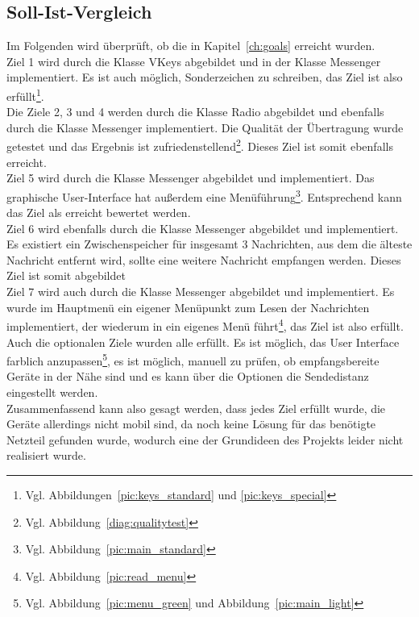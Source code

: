 \documentclass[a4paper, 11pt]{scrartcl}
\begin{document}
\subsection{Soll-Ist-Vergleich}
Im Folgenden wird überprüft, ob die in Kapitel~\ref{ch:goals} erreicht wurden.
\\
Ziel 1 wird durch die Klasse \glqq VKeys\grqq{} abgebildet und in der Klasse \grqq Messenger\glqq{} implementiert. 
Es ist auch möglich, Sonderzeichen zu schreiben, das Ziel ist also erfüllt\footnote{Vgl. Abbildungen~\ref{pic:keys_standard} und \ref{pic:keys_special}}.
\\
Die Ziele 2, 3 und 4 werden durch die Klasse \glqq Radio\grqq{} abgebildet und ebenfalls durch die Klasse \glqq Messenger\grqq{} implementiert. Die Qualität der Übertragung
wurde getestet und das Ergebnis ist zufriedenstellend\footnote{Vgl. Abbildung~\ref{diag:qualitytest}}. Dieses Ziel ist somit ebenfalls erreicht.
\\
Ziel 5 wird durch die Klasse \glqq Messenger\grqq{} abgebildet und implementiert. Das graphische User-Interface hat außerdem eine 
Menüführung\footnote{Vgl. Abbildung~\ref{pic:main_standard}}. Entsprechend kann das Ziel als erreicht bewertet werden.
\\
Ziel 6 wird ebenfalls durch die Klasse \glqq Messenger\grqq{} abgebildet und implementiert. Es existiert ein Zwischenspeicher für insgesamt 3 Nachrichten, aus dem
die älteste Nachricht entfernt wird, sollte eine weitere Nachricht empfangen werden. Dieses Ziel ist somit abgebildet
\\
Ziel 7 wird auch durch die Klasse \glqq Messenger\grqq{} abgebildet und implementiert. Es wurde im Hauptmenü ein eigener Menüpunkt zum Lesen der Nachrichten implementiert,
der wiederum in ein eigenes Menü führt\footnote{Vgl. Abbildung~\ref{pic:read_menu}}, das Ziel ist also erfüllt.
\\
Auch die optionalen Ziele wurden alle erfüllt. Es ist möglich, das User Interface farblich anzupassen\footnote{Vgl. Abbildung~\ref{pic:menu_green} und Abbildung~\ref{pic:main_light}},
es ist möglich, manuell zu prüfen, ob empfangsbereite Geräte in der Nähe sind und es kann über die Optionen die Sendedistanz eingestellt werden.
\\
Zusammenfassend kann also gesagt werden, dass jedes Ziel erfüllt wurde, die Geräte allerdings nicht mobil sind, da noch keine Lösung für das benötigte Netzteil gefunden wurde,
wodurch eine der Grundideen des Projekts leider nicht realisiert wurde.
\end{document}
